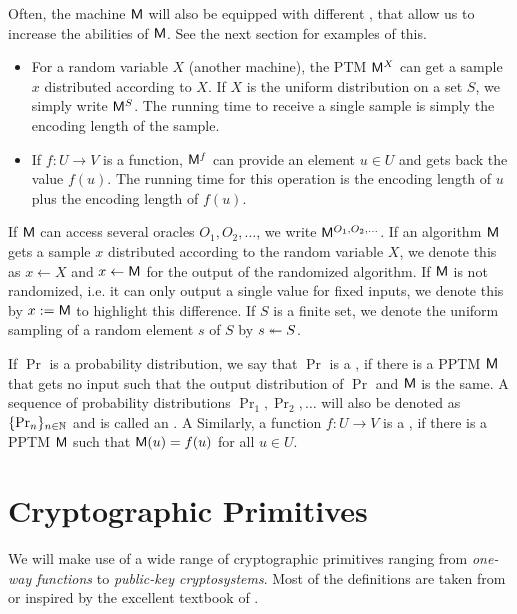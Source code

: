 Often, the machine $\mathsf{M}$ will also be equipped with different
, that allow us to increase the abilities of $\mathsf{M}$. See the
next section for examples of this. 
\begin{itemize}
\item For a random variable $X$ (\eg another machine), the PTM $\mathsf{M}^{X}$
  can get a sample $x$ distributed according to $X$. If $X$ is the
  uniform distribution on a set $S$, we simply write
  $\mathsf{M}^{S}$. The running time to receive
  a single sample is simply the encoding length of the sample.
\item If $f\colon U\to V$ is a function, $\mathsf{M}^{f}$ can provide an element
  $u\in U$ and gets back the value $f(u)$.  The running time for this
  operation is the encoding length of $u$ plus the encoding length of
  $f(u)$. 
\end{itemize}
If $\mathsf{M}$ can access several oracles $O_{1},O_{2},\ldots$, we write
$\mathsf{M}^{O_{1},O_{2},\ldots}$. If an algorithm $\mathsf{M}$ gets a sample $x$
distributed according to the random variable $X$, we denote this as
$x\gets X$ and $x\gets \mathsf{M}$ for the output of the randomized
algorithm. If $\mathsf{M}$ is not randomized, i.e. it can only output a
single value for fixed inputs, we denote this by $x := \mathsf{M}$ to
highlight this difference. If $S$ is a finite set, we denote the
uniform sampling of a random element $s$ of $S$ by $s\twoheadleftarrow
S$. 

If $\Pr$ is a probability distribution, we say
that $\Pr$ is a , if there is a \ac{PPTM}
$\mathsf{M}$ that gets no input such that the output distribution of
$\Pr$ and $\mathsf{M}$ is the same. A sequence of probability
distributions $\Pr_{1},\Pr_{2},\ldots$ will also be denoted as
$\{\Pr_{n}\}_{n\in \mathbb{N}}$ and is called an . A
Similarly, a function $f\colon U\to V$ is a , if there is a \ac{PPTM} $\mathsf{M}$ such that
$\mathsf{M}(u)=f(u)$ for all $u\in U$. 

\section{Cryptographic Primitives}
\label{sec:primitives}
We will make use of a wide range of cryptographic primitives ranging
from \emph{one-way functions} to \emph{public-key cryptosystems}. Most
of the definitions are taken from or inspired by the excellent textbook
of \citeauthor{lindell2007introduction}
\cite{lindell2007introduction}. 

